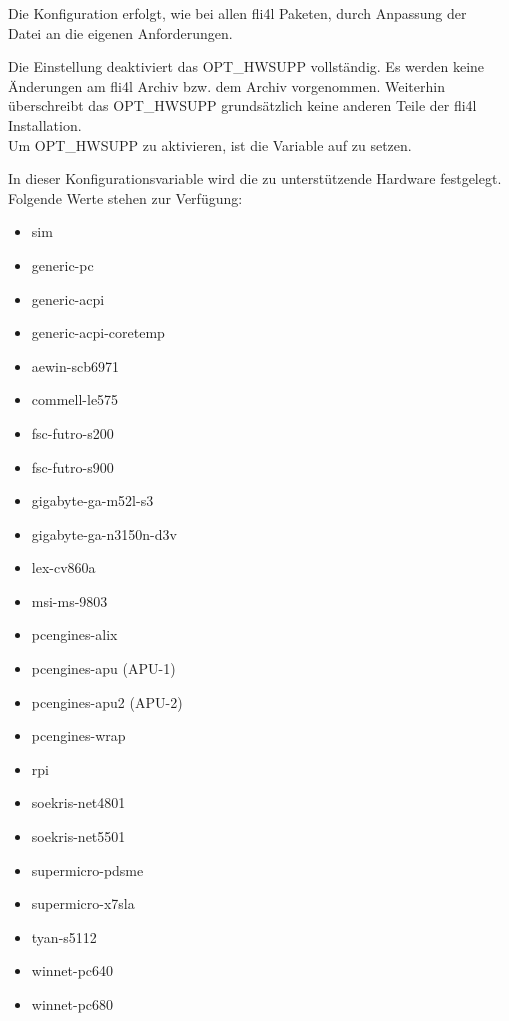   Die Konfiguration erfolgt, wie bei allen fli4l Paketen, durch Anpassung der \\
  Datei  
  an die eigenen Anforderungen.
  
\begin{description}


  Die Einstellung  deaktiviert das OPT\_HWSUPP vollständig. Es werden
  keine Änderungen am fli4l Archiv  bzw. dem Archiv 
  vorgenommen. Weiterhin überschreibt das OPT\_HWSUPP grundsätzlich keine anderen
  Teile der fli4l Installation.\\
  Um OPT\_HWSUPP zu aktivieren, ist die Variable  auf 
   zu setzen.
  

  In dieser Konfigurationsvariable wird die zu unterstützende Hardware festgelegt.
  Folgende Werte stehen zur Verfügung:
  \begin{itemize}
    \item sim
    \item generic-pc
    \item generic-acpi
    \item generic-acpi-coretemp
    \item aewin-scb6971
    \item commell-le575
    \item fsc-futro-s200
    \item fsc-futro-s900
    \item gigabyte-ga-m52l-s3
    \item gigabyte-ga-n3150n-d3v
    \item lex-cv860a
    \item msi-ms-9803
    \item pcengines-alix
    \item pcengines-apu (APU-1)
    \item pcengines-apu2 (APU-2)
    \item pcengines-wrap 
    \item rpi
    \item soekris-net4801
    \item soekris-net5501
    \item supermicro-pdsme
    \item supermicro-x7sla
    \item tyan-s5112
    \item winnet-pc640
    \item winnet-pc680 
  \end{itemize}
  

\end{description}
